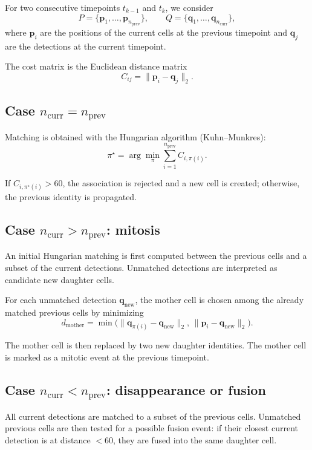 \documentclass[11pt,a4paper]{article}
\begin{document}
For two consecutive timepoints $t_{k-1}$ and $t_k$, we consider
\[
P=\{\mathbf{p}_1,\dots,\mathbf{p}_{n_{\mathrm{prev}}}\},
\qquad
Q=\{\mathbf{q}_1,\dots,\mathbf{q}_{n_{\mathrm{curr}}}\},
\]
where $\mathbf{p}_i$ are the positions of the current cells at the previous timepoint and $\mathbf{q}_j$ are the detections at the current timepoint.

The cost matrix is the Euclidean distance matrix
\[
C_{ij}=\|\mathbf{p}_i-\mathbf{q}_j\|_2.
\]

\subsection{Case $n_{\mathrm{curr}}=n_{\mathrm{prev}}$}

Matching is obtained with the Hungarian algorithm (Kuhn--Munkres):
\[
\pi^\star=\arg\min_{\pi}\sum_{i=1}^{n_{\mathrm{prev}}} C_{i,\pi(i)}.
\]

If $C_{i,\pi^\star(i)}>60$, the association is rejected and a new cell is created; otherwise, the previous identity is propagated.

\subsection{Case $n_{\mathrm{curr}}>n_{\mathrm{prev}}$: mitosis}

An initial Hungarian matching is first computed between the previous cells and a subset of the current detections. Unmatched detections are interpreted as candidate new daughter cells.

For each unmatched detection $\mathbf{q}_{\mathrm{new}}$, the mother cell is chosen among the already matched previous cells by minimizing
\[
d_{\mathrm{mother}}=\min\Big(
\|\mathbf{q}_{\pi(i)}-\mathbf{q}_{\mathrm{new}}\|_2,\,
\|\mathbf{p}_{i}-\mathbf{q}_{\mathrm{new}}\|_2
\Big).
\]

The mother cell is then replaced by two new daughter identities. The mother cell is marked as a mitotic event at the previous timepoint.

\subsection{Case $n_{\mathrm{curr}}<n_{\mathrm{prev}}$: disappearance or fusion}

All current detections are matched to a subset of the previous cells. Unmatched previous cells are then tested for a possible fusion event: if their closest current detection is at distance $<60$, they are fused into the same daughter cell.
\end{document}
